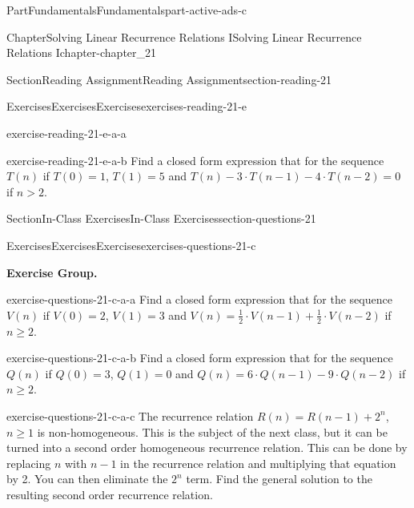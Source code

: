 \documentclass[oneside,10pt,]{book}
\numberwithin{equation}{section}
\newcommand{\gt}{>}
\begin{document}
\begin{partptx}{Part}{Fundamentals}{}{Fundamentals}{}{}{part-active-ads-c}
\begin{chapterptx}{Chapter}{Solving Linear Recurrence Relations I}{}{Solving Linear Recurrence Relations I}{}{}{chapter-chapter_21}
\begin{sectionptx}{Section}{Reading Assignment}{}{Reading Assignment}{}{}{section-reading-21}
\begin{exercises-subsection-numberless}{Exercises}{Exercises}{}{Exercises}{}{}{exercises-reading-21-e}
\begin{exercisegroup}
\begin{divisionexerciseeg}{1}{}{}{exercise-reading-21-e-a-a}
\end{divisionexerciseeg}%
\begin{divisionexerciseeg}{2}{}{}{exercise-reading-21-e-a-b}%
Find a closed form expression that for the sequence \(T(n)\) if  \(T(0)=1\), \(T(1)= 5\) and \(T(n)- 3\cdot T(n-1) -4 \cdot T(n-2)=0\) if \(n \gt 2\).%
\end{divisionexerciseeg}%
\end{exercisegroup}
\par\medskip\noindent
\end{exercises-subsection-numberless}
\end{sectionptx}
%
%
\typeout{************************************************}
\typeout{************************************************}
%
\begin{sectionptx}{Section}{In-Class Exercises}{}{In-Class Exercises}{}{}{section-questions-21}
%
%
%
\typeout{************************************************}
\typeout{************************************************}
%
\begin{exercises-subsection-numberless}{Exercises}{Exercises}{}{Exercises}{}{}{exercises-questions-21-c}
\par\medskip\noindent%
\textbf{Exercise Group.}\space\space%
\begin{exercisegroup}
\begin{divisionexerciseeg}{1}{}{}{exercise-questions-21-c-a-a}%
Find a closed form expression that for the sequence \(V(n)\) if  \(V(0)=2\), \(V(1)= 3\) and \(V(n)= \frac{1}{2}\cdot V(n-1)+ \frac{1}{2}\cdot V(n-2)\) if \(n \geq 2\).%
\end{divisionexerciseeg}%
\begin{divisionexerciseeg}{2}{}{}{exercise-questions-21-c-a-b}%
Find a closed form expression that for the sequence \(Q(n)\) if  \(Q(0)=3\), \(Q(1)= 0\) and \(Q(n)=6\cdot Q(n-1)-9\cdot Q(n-2)\) if \(n \geq 2\).%
\end{divisionexerciseeg}%
\begin{divisionexerciseeg}{3}{}{}{exercise-questions-21-c-a-c}%
The recurrence relation \(R(n)=R(n-1)+2^n\), \(n \geq 1\) is non-homogeneous.  This is the subject of the next class, but it can be turned into a second order homogeneous recurrence relation.  This can be done by replacing \(n\) with \(n-1\) in the recurrence relation and multiplying that equation by 2.   You can then eliminate the \(2^n\) term. Find the general solution to the resulting second order recurrence relation.%

\end{divisionexerciseeg}
\end{exercisegroup}
\end{exercises-subsection-numberless}
\end{sectionptx}
\end{chapterptx}
\end{partptx}
\end{document}
